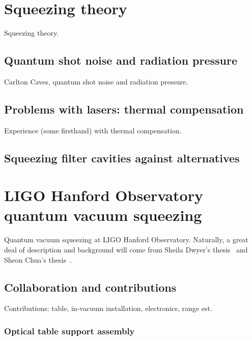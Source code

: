 



    \section{Squeezing theory}
    \label{squeezing_theory}

        Squeezing theory.

        \subsection{Quantum shot noise and radiation pressure}
        \label{quantum_noise}

            Carlton Caves, quantum shot noise and radiation pressure.

        \subsection{Problems with lasers: thermal compensation}
        \label{TCS}

            Experience (some firsthand) with thermal compensation.

        \subsection{Squeezing filter cavities against alternatives}
        \label{third-gen_squeezing}

    \section{LIGO Hanford Observatory quantum vacuum squeezing}
    \label{LHO_squeeze}

        Quantum vacuum squeezing at LIGO Hanford Observatory. Naturally, a great deal of description and background will come from Sheila Dwyer's thesis~\cite{DwyerThesis} and Sheon Chua's thesis~\cite{ChuaThesis}.

        \subsection{Collaboration and contributions}
        \label{contributions}

            Contributions: table, in-vacuum installation, electronics, range est.

            \subsubsection{Optical table support assembly}
            \label{table_legs}

